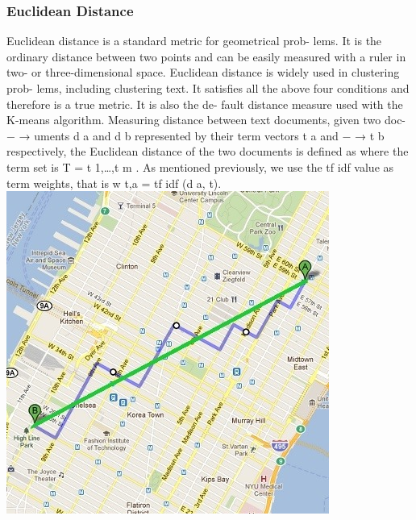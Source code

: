 \documentclass{VUMIFInfKursinis}
\begin{document}
\subsubsection{Euclidean Distance}
Euclidean distance is a standard metric for geometrical prob- lems. It is the ordinary distance between two points and can be easily measured with a ruler in two- or three-dimensional space. Euclidean distance is widely used in clustering prob- lems, including clustering text. It satisfies all the above four conditions and therefore is a true metric. It is also the de- fault distance measure used with the K-means algorithm.
Measuring distance between text documents, given two doc- − → uments d a and d b represented by their term vectors t a and − → t b respectively, the Euclidean distance of the two documents is defined as
where the term set is T = {t 1,\ldots,t m }. As mentioned previously, we use the tf idf value as term weights, that is w t,a = tf idf (d a, t).
\includegraphics{MvsE}
\end{document}
